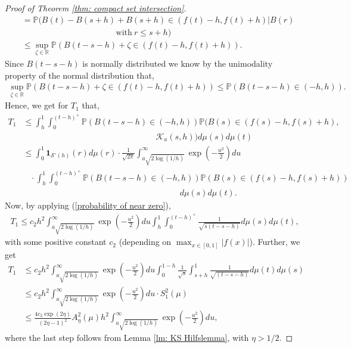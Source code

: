 \documentclass[11pt, reqno]{amsart}
\theoremstyle{plain}
\theoremstyle{definition}
\theoremstyle{remark}
\begin{document}
\begin{proof}[Proof of Theorem \ref{thm: compact set intersection}]
\begin{align*}
&= {\mathbb{P}}(B(t)-B(s+h)+B(s+h)\in (f(t)-h, f(t)+h) | B(r) \\
&\ \ \ \ \ \ \ \ \ \ \ \ \ \ \ \ \ \ \ \ \ \ \ \ \ \ \ \ \  \ \ \ \ \ \ \ \ \ \ \ \ \ \ \ \ \ \ \ \ \ \ \text{with} \ r \leq s+h)\\
&\leq \sup_{\zeta \in {\mathbb{R}}} {\mathbb{P}} ( B(t-s-h) + \zeta \in (f(t)-h, f(t)+h)).
\end{align*}
Since $B(t-s-h)$ is normally distributed we know by the unimodality property of the normal distribution that,
\begin{align*}
\sup_{\zeta \in {\mathbb{R}}} {\mathbb{P}} ( B(t-s-h) + \zeta \in (f(t)-h, f(t)+h)) \leq {\mathbb{P}} ( B(t-s-h) \in (-h,h)).
\end{align*}
Hence, we get for $T_1$ that,
\begin{align*}
T_1 &\leq \int_h^1 \int_0^{(t-h)^+} {\mathbb{P}} ( B(t-s-h) \in (-h,h)) {\mathbb{P}}  \big( B(s) \in (f(s)-h, f(s)+h),\\  
&\ \ \ \ \ \ \ \ \ \ \ \ \ \ \ \ \ \ \ \ \ \ \ \ \ \ \ \ \ \ \ \
\ \ \ \ \ \ \ \ \ \ \ \ \ \ \ \ \ \ \ \ \ \ \ \ \ \ \ \ \ \ \ \ \ \ \
\ \ \ \ \  {\mathcal{K}}_a(s,h) \big) d\mu(s)d\mu(t)\\
&\leq \int_0^1 {\mathbf{1}}_{{\mathcal{S}}^\circ(h)}(r)d\mu (r) \cdot \frac{1}{\sqrt{2\pi}}\int_{a\sqrt{2\log(1/h)}}^\infty \exp(-\frac{u^2}{2}) du \\ 
& \  \ \ \ \cdot \int_h^1 \int_0^{(t-h)^+} {\mathbb{P}} ( B(t-s-h) \in (-h,h)) 
 {\mathbb{P}}  \left( B(s) \in (f(s)-h, f(s)+h) \right) \\
&\ \ \ \ \ \ \ \ \ \ \ \ \ \ \ \ \ \ \ \ \ \ \ \ \ \ \ \ \ \ \ \
\ \ \ \ \ \ \ \ \ \ \ \ \ \ \ \ \ \ \ \ \ \ \ \ \ \ \ \ \ \ \ \ \ \ \
\ \ \ \ \  \ \ \ \ \ \ \ \ \ \ \ \ \ d\mu(s)d\mu(t).
\end{align*}
Now, by applying (\ref{probability of near zero}),
\begin{align*}
T_1 \leq c_2 h^2\int_{a\sqrt{2\log(1/h)}}^\infty \exp(-\frac{u^2}{2}) du  \int_h^1 \int_0^{(t-h)^+} \frac{1}{\sqrt{s(t-s-h)}} d\mu(s)d\mu(t),
\end{align*}
with some positive constant $c_2$ (depending on $\max_{x\in[0,1]} |f(x)|$). Further, we get
\begin{align}\label{T_1 upper bound estimate}
T_1 &\leq c_2 h^2\int_{a\sqrt{2\log(1/h)}}^\infty \exp(-\frac{u^2}{2}) du  \int_0^{1-h} \frac{1}{\sqrt{s}}  \int_{s+h}^{1} \frac{1}{\sqrt{(t-s-h)}} d\mu(t)d\mu(s) \nonumber\\
&\leq c_2 h^2\int_{a\sqrt{2\log(1/h)}}^\infty \exp(-\frac{u^2}{2}) du  \cdot S_1^2(\mu) \nonumber\\
&\leq \frac{4c_2 \exp{(2\eta)}}{(2\eta-1)^2} A_\eta^2(\mu) h^2\int_{a\sqrt{2\log(1/h)}}^\infty \exp(-\frac{u^2}{2}) du,
\end{align}
where the last step follows from Lemma \ref{lm: KS Hilfslemma}, with $\eta >1/2$.


\end{proof}
\end{document}

